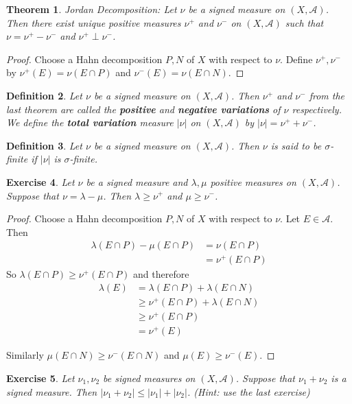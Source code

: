 \documentclass[12pt]{amsart}
\newtheorem{thm}{Theorem}[section]
\newtheorem{defn}[thm]{Definition}
\newtheorem{ex}[thm]{Exercise}
\newcommand{\lam}{\lambda}
\newcommand{\sig}{\sigma}
\newcommand{\MA}{\mathcal{A}}
\begin{document}
\begin{thm}{Jordan Decomposition:}
Let $\nu$ be a signed measure on $(X, \MA)$. Then there exist unique positive measures $\nu^+$ and $\nu^-$ on $(X, \MA)$ such that $\nu = \nu^+ - \nu^-$ and $\nu^+ \perp \nu^-$. 
\end{thm}

\begin{proof}
Choose a Hahn decomposition $P,N$ of $X$ with respect to $\nu$. Define $\nu^+, \nu^-$ by $\nu^+(E)= \nu(E \cap P)$ and $\nu^-(E) = \nu(E \cap N)$.
\end{proof}

\begin{defn}
Let $\nu$ be a signed measure on $(X, \MA)$. Then $\nu^+$ and $\nu^-$ from the last theorem are called the \textbf{positive} and \textbf{negative variations} of $\nu$ respectively. We define the \textbf{total variation} measure $|\nu|$ on $(X, \MA)$ by $|\nu| = \nu^+ + \nu^-$. 
\end{defn}

\begin{defn}
Let $\nu$ be a signed measure on $(X,\MA)$. Then $\nu$ is said to be $\sig$-finite if $|\nu|$ is $\sig$-finite.
\end{defn}

\begin{ex}
Let $\nu$ be a signed measure and $\lam, \mu$ positive measures on $(X,\MA)$. Suppose that $\nu = \lam - \mu$. Then $\lam \geq \nu^+$ and $\mu \geq \nu^-$.
\end{ex}

\begin{proof}
Choose a Hahn decomposition $P,N$ of $X$ with respect to $\nu$. Let $E \in \MA$. Then 
\begin{align*}
\lam(E \cap P) - \mu(E \cap P) 
&= \nu(E \cap P)\\
&= \nu^+(E \cap P)
\end{align*}
So $\lam(E \cap P) \geq  \nu^+(E \cap P) $ and therefore 
\begin{align*}
\lam(E) 
&= \lam(E \cap P) + \lam(E \cap N)\\
& \geq \nu^+(E \cap P) + \lam (E \cap N)\\
& \geq \nu^+(E \cap P)\\
& = \nu^+(E)
\end{align*} 

Similarly $\mu(E \cap N) \geq \nu^-(E \cap N)$ and $\mu(E) \geq \nu^-(E)$.
\end{proof}

\begin{ex}
Let $\nu_1, \nu_2$ be signed measures on $(X, \MA)$. Suppose that $\nu_1 + \nu_2$ is a signed measure. Then $|\nu_1 + \nu_2| \leq |\nu_1|+ |\nu_2|$. (Hint: use the last exercise)
\end{ex}
\end{document}
